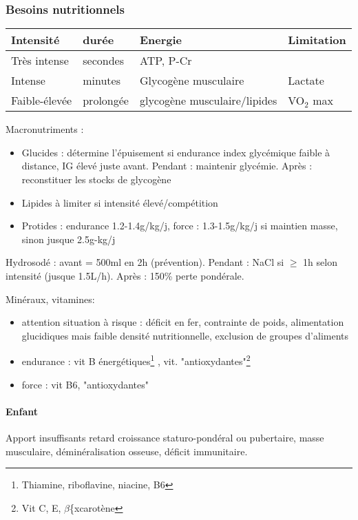 \documentclass[11pt]{article}
\begin{document}
\subsubsection{Besoins nutritionnels}
\label{sec:org3318546}

\begin{center}
\begin{tabular}{llll}
Intensité & durée & Energie & Limitation\\
\hline
Très intense & secondes & ATP, P-Cr & \\
Intense & minutes & Glycogène musculaire & Lactate\\
Faible-élevée & prolongée & glycogène musculaire/lipides & VO\(_{\text{2}}\) max\\
\end{tabular}
\end{center}

Macronutriments :
\begin{itemize}
\item Glucides : détermine l'épuisement si endurance \thus index glycémique faible à
distance, IG élevé juste avant. Pendant : maintenir glycémie. Après :
reconstituer les stocks de glycogène
\item Lipides à limiter si intensité élevé/compétition
\item Protides : endurance 1.2-1.4g/kg/j, force : 1.3-1.5g/kg/j si maintien masse, sinon jusque 2.5g-kg/j
\end{itemize}

Hydrosodé : avant = 500ml en 2h (prévention). Pendant : NaCl si \(\ge\) 1h selon
intensité (jusque 1.5L/h). Après : 150\% perte pondérale.

Minéraux, vitamines:
\begin{itemize}
\item attention situation à risque : déficit en fer, contrainte de poids,
alimentation glucidiques mais faible densité nutritionnelle, exclusion de
groupes d'aliments
\item endurance : vit B énergétiques\footnote{Thiamine, riboflavine, niacine, B6} , vit. "antioxydantes"\footnote{Vit C, E, \(\beta\)\{xcarotène}
\item force : \inc vit B6, \inc "antioxydantes"
\end{itemize}

\paragraph{Enfant}
\label{sec:org4cb7d0e}
Apport insuffisants \thus retard croissance staturo-pondéral ou pubertaire,
\dec masse musculaire, déminéralisation osseuse, déficit immunitaire.
\end{document}
